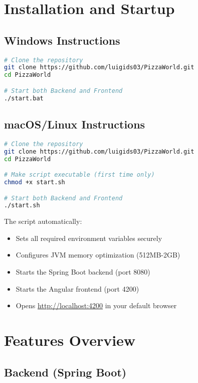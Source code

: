 \documentclass[11pt,a4paper]{article}
\begin{document}
\section{Installation and Startup}

\subsection{Windows Instructions}

\begin{lstlisting}[language=bash, caption=Windows Installation]
# Clone the repository
git clone https://github.com/luigids03/PizzaWorld.git
cd PizzaWorld

# Start both Backend and Frontend
./start.bat
\end{lstlisting}

\subsection{macOS/Linux Instructions}

\begin{lstlisting}[language=bash, caption=macOS/Linux Installation]
# Clone the repository
git clone https://github.com/luigids03/PizzaWorld.git
cd PizzaWorld

# Make script executable (first time only)
chmod +x start.sh

# Start both Backend and Frontend
./start.sh
\end{lstlisting}

The script automatically:
\begin{itemize}[leftmargin=*]
    \item Sets all required environment variables securely
    \item Configures JVM memory optimization (512MB-2GB)
    \item Starts the Spring Boot backend (port 8080)
    \item Starts the Angular frontend (port 4200)
    \item Opens \href{http://localhost:4200}{http://localhost:4200} in your default browser
\end{itemize}

\section{Features Overview}

\subsection{Backend (Spring Boot)}
\end{document}
